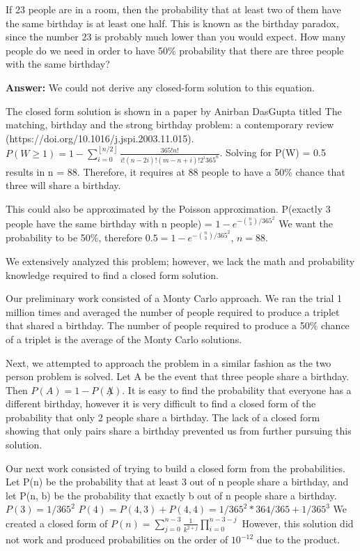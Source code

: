 \documentclass{article}
\author{Group 13: Elliott Pryor, Ben Bushnell, Shengnan Zhou}
\date{due: 18 October 2019}
\begin{document}
\nextprob
If 23 people are in a room, then the probability that at least two of them have
the same birthday is at least one half.  This is known as the birthday paradox,
since the number 23 is probably much lower than you would expect.  How many
people do we need in order to have 50\% probability that there are three people
with the same birthday?


\textbf{Answer: } We could not derive any closed-form solution to this equation. 

The closed form solution is shown in a paper by Anirban DasGupta titled The matching, birthday and the strong birthday problem: a contemporary review (https://doi.org/10.1016/j.jspi.2003.11.015). $P(W \geq 1) = 1 - \sum_{i=0}^{\left \lfloor{n/2}\right \rfloor } \frac{365!n!}{i!(n-2i)!(m-n+i)!2^i365^n}$. Solving for P(W) = 0.5 results in n = 88. Therefore, it requires at 88 people to have a 50\% chance that three will share a birthday. 

This could also be approximated by the Poisson approximation. 
P(exactly 3 people have the same birthday with n people) = $1 - e^{-{n\choose 3}/365^2}$
We want the probability to be 50\%, therefore $0.5 = 1 - e^{-{n\choose 3}/365^2}$, $n = 88$.

We extensively analyzed this problem; however, we lack the math and probability knowledge required to find a closed form solution. 

Our preliminary work consisted of a Monty Carlo approach. We ran the trial 1 million times and averaged the number of people required to produce a triplet that shared a birthday. The number of people required to produce a 50\% chance of a triplet is the average of the Monty Carlo solutions. 

Next, we attempted to approach the problem in a similar fashion as the two person problem is solved. Let A be the event that three people share a birthday. Then $P(A) = 1 - P(\not A)$. It is easy to find the probability that everyone has a different birthday, however it is very difficult to find a closed form of the probability that only 2 people share a birthday. The lack of a closed form showing that only pairs share a birthday prevented us from further pursuing this solution.

Our next work consisted of trying to build a closed form from the probabilities. Let P(n) be the probability that at least 3 out of n people share a birthday, and let P(n, b) be the probability that exactly b out of n people share a birthday. 
$P(3) = 1/365^2$
$P(4) = P(4,3) + P(4,4) = 1/365^2 * 364/365 + 1/365^3$
We created a closed form of $P(n) = \sum_{j=0}^{n-3} \frac{1}{k^{2+j}} \prod_{i=0}^{n-3-j}$ However, this solution did not work and produced probabilities on the order of $10^{-12}$ due to the product.
\end{document}
